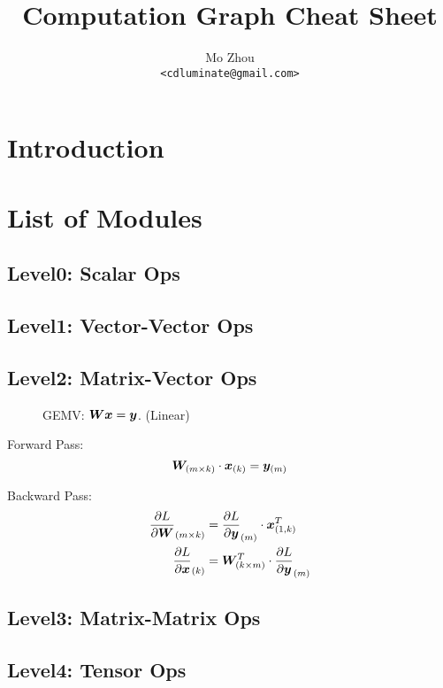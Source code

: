 \documentclass[9pt,twocolumn,times]{article}
\title{Computation Graph Cheat Sheet}
\author{Mo Zhou\\\small\texttt{<cdluminate@gmail.com>}}
\begin{document}
\maketitle

\section{Introduction}

\section{List of Modules}

\subsection{Level0: Scalar Ops}

\subsection{Level1: Vector-Vector Ops}

\subsection{Level2: Matrix-Vector Ops}

\begin{figure}[h]
	\centering
	\resizebox{0.618\columnwidth}{!}{%
		
	}
	\caption{GEMV: ${\bm{W}} {\bm{x}} = {\bm{y}}$. (Linear)}
\end{figure}

	Forward Pass:
	\begin{equation}
		{\bm{W}}_{(m\times k)} \cdot {\bm{x}}_{(k)} = {\bm{y}}_{(m)}
	\end{equation}

	Backward Pass:
	\begin{align}
		\frac{\partial L}{\partial{\bm{W}}}_{(m\times k)} &=
		\frac{\partial L}{\partial{\bm{y}}}_{(m)} \cdot {\bm{x}}^T_{(1,k)}\\
		\frac{\partial L}{\partial{\bm{x}}}_{(k)} &=
		{\bm{W}}^T_{(k\times m)} \cdot \frac{\partial L}{\partial {\bm{y}}}_{(m)}
	\end{align}

\subsection{Level3: Matrix-Matrix Ops}

\subsection{Level4: Tensor Ops}
\end{document}
